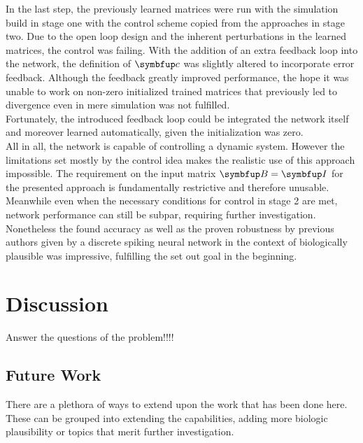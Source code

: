 In the last step, the previously learned matrices were run with the simulation build in stage one with the control scheme copied from the approaches in stage two. Due to the open loop design and the inherent perturbations in the learned matrices, the control was failing. With the addition of an extra feedback loop into the network, the definition of $\bmu{c}$ was slightly altered to incorporate error feedback.
Although the feedback greatly improved performance, the hope it was unable to work on non-zero initialized trained matrices that previously led to divergence even in mere simulation was not fulfilled.\\
Fortunately, the introduced feedback loop could be integrated the network itself and moreover learned automatically, given the initialization was zero.\\

All in all, the network is capable of controlling a dynamic system. However the limitations set mostly by the control idea makes the realistic use of this approach impossible. The requirement on the input matrix $\bmu{B} = \bmu{I}$ for the presented approach is fundamentally restrictive and therefore unusable. Meanwhile even when the necessary conditions for control in stage 2 are met, network performance can still be subpar, requiring further investigation.\\

Nonetheless the found accuracy as well as the proven robustness by previous authors given by a discrete spiking neural network in the context of biologically plausible was impressive, fulfilling the set out goal in the beginning.\\

\section{Discussion}

Answer the questions of the problem!!!!\\

\subsection{Future Work}

There are a plethora of ways to extend upon the work that has been done here. These can be grouped into extending the capabilities, adding more biologic plausibility or topics that merit further investigation.
